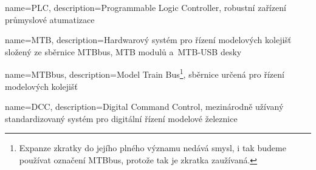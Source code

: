  {
	name=PLC,
	description={Programmable Logic Controller, robustní zařízení průmyslové
	atumatizace}
}

 {
	name=MTB,
	description={Hardwarový systém pro řízení modelových kolejišť složený ze
	sběrnice MTBbus, MTB modulů a~MTB-USB desky}
}

 {
	name=MTBbus,
	description={Model Train Bus\footnote{Expanze zkratky do jejího plného
	významu nedává smysl, i tak budeme používat označení MTBbus, protože tak je
	zkratka zaužívaná.}, sběrnice určená pro řízení modelových kolejišť}
}

 {
	name=DCC,
	description={Digital Command Control, mezinárodně užívaný standardizovaný
	systém pro digitální řízení modelové železnice}
}






\printglossary[title=Seznam použitých zkratek]
